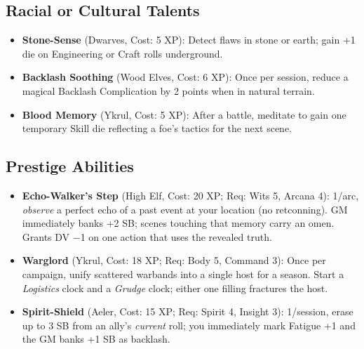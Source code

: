 \subsection{Racial or Cultural Talents}
\begin{itemize}
    \item \textbf{Stone-Sense} (Dwarves, Cost: 5 XP): Detect flaws in stone or earth; gain +1 die on Engineering or Craft rolls underground.
    \item \textbf{Backlash Soothing} (Wood Elves, Cost: 6 XP): Once per session, reduce a magical Backlash Complication by 2 points when in natural terrain.
    \item \textbf{Blood Memory} (Ykrul, Cost: 5 XP): After a battle, meditate to gain one temporary Skill die reflecting a foe's tactics for the next scene.
\end{itemize}

\subsection{Prestige Abilities}
\begin{itemize}
    \item \textbf{Echo-Walker's Step} (High Elf, Cost: 20 XP; Req: Wits 5, Arcana 4): 
1/arc, \emph{observe} a perfect echo of a past event at your location (no retconning). 
GM immediately banks +2 SB; scenes touching that memory carry an omen. Grants DV −1 on one action that uses the revealed truth.
    \item \textbf{Warglord} (Ykrul, Cost: 18 XP; Req: Body 5, Command 3): 
Once per campaign, unify scattered warbands into a single host for a season. Start a \emph{Logistics} clock and a \emph{Grudge} clock; either one filling fractures the host.
    \item \textbf{Spirit-Shield} (Aeler, Cost: 15 XP; Req: Spirit 4, Insight 3): 
1/session, erase up to 3 SB from an ally's \emph{current} roll; you immediately mark Fatigue +1 and the GM banks +1 SB as backlash.
\end{itemize}

